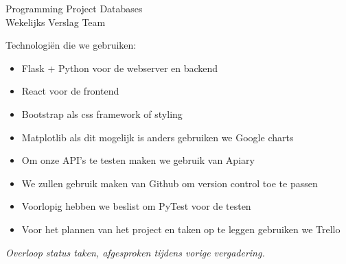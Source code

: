 \documentclass[a4paper]{article}
\newcounter{team}
\begin{document}
	
	\begin{Minutes}{Programming Project Databases \\ Wekelijks Verslag Team }
		\missingNoExcuse{\ldots}
		\missingExcused{\ldots}
		
		\maketitle
		
		
		Technologiën die we gebruiken:
		\begin{itemize}
		    \item Flask + Python voor de webserver en backend
		    \item React voor de frontend
		    \item Bootstrap als css framework of styling
		    \item Matplotlib als dit mogelijk is anders gebruiken we Google charts
		    \item Om onze API's te testen maken we gebruik van Apiary
		    \item We zullen gebruik maken van Github om version control toe te passen
		    \item Voorlopig hebben we beslist om PyTest voor de testen
		    \item Voor het plannen van het project en taken op te leggen gebruiken we Trello
		\end{itemize}
		
			\emph{Overloop status taken, afgesproken tijdens vorige vergadering.}
		
			
				

\end{Minutes}
\end{document}
